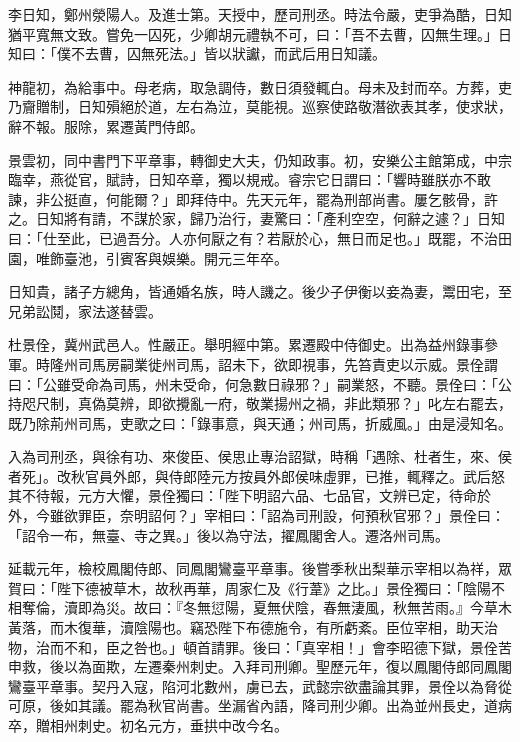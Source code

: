 \begin{pinyinscope}
 李日知，鄭州滎陽人。及進士第。天授中，歷司刑丞。時法令嚴，吏爭為酷，日知猶平寬無文致。嘗免一囚死，少卿胡元禮執不可，曰：「吾不去曹，囚無生理。」日知曰：「僕不去曹，囚無死法。」皆以狀讞，而武后用日知議。



 神龍初，為給事中。母老病，取急調侍，數日須發輒白。母未及封而卒。方葬，吏乃齎贈制，日知殞絕於道，左右為泣，莫能視。巡察使路敬潛欲表其孝，使求狀，辭不報。服除，累遷黃門侍郎。



 景雲初，同中書門下平章事，轉御史大夫，仍知政事。初，安樂公主館第成，中宗臨幸，燕從官，賦詩，日知卒章，獨以規戒。睿宗它日謂曰：「響時雖朕亦不敢諫，非公挺直，何能爾？」即拜侍中。先天元年，罷為刑部尚書。屢乞骸骨，許之。日知將有請，不謀於家，歸乃治行，妻驚曰：「產利空空，何辭之遽？」日知曰：「仕至此，已過吾分。人亦何厭之有？若厭於心，無日而足也。」既罷，不治田園，唯飾臺池，引賓客與娛樂。開元三年卒。



 日知貴，諸子方總角，皆通婚名族，時人譏之。後少子伊衡以妾為妻，鬻田宅，至兄弟訟鬩，家法遂替雲。



 杜景佺，冀州武邑人。性嚴正。舉明經中第。累遷殿中侍御史。出為益州錄事參軍。時隆州司馬房嗣業徙州司馬，詔未下，欲即視事，先笞責吏以示威。景佺謂曰：「公雖受命為司馬，州未受命，何急數日祿邪？」嗣業怒，不聽。景佺曰：「公持咫尺制，真偽莫辨，即欲攪亂一府，敬業揚州之禍，非此類邪？」叱左右罷去，既乃除荊州司馬，吏歌之曰：「錄事意，與天通；州司馬，折威風。」由是浸知名。



 入為司刑丞，與徐有功、來俊臣、侯思止專治詔獄，時稱「遇除、杜者生，來、侯者死」。改秋官員外郎，與侍郎陸元方按員外郎侯味虛罪，已推，輒釋之。武后怒其不待報，元方大懼，景佺獨曰：「陛下明詔六品、七品官，文辨已定，待命於外，今雖欲罪臣，奈明詔何？」宰相曰：「詔為司刑設，何預秋官邪？」景佺曰：「詔令一布，無臺、寺之異。」後以為守法，擢鳳閣舍人。遷洛州司馬。



 延載元年，檢校鳳閣侍郎、同鳳閣鸞臺平章事。後嘗季秋出梨華示宰相以為祥，眾賀曰：「陛下德被草木，故秋再華，周家仁及《行葦》之比。」景佺獨曰：「陰陽不相奪倫，瀆即為災。故曰：『冬無愆陽，夏無伏陰，春無淒風，秋無苦雨。』今草木黃落，而木復華，瀆陰陽也。竊恐陛下布德施令，有所虧紊。臣位宰相，助天治物，治而不和，臣之咎也。」頓首請罪。後曰：「真宰相！」會李昭德下獄，景佺苦申救，後以為面欺，左遷秦州刺史。入拜司刑卿。聖歷元年，復以鳳閣侍郎同鳳閣鸞臺平章事。契丹入寇，陷河北數州，虜已去，武懿宗欲盡論其罪，景佺以為脅從可原，後如其議。罷為秋官尚書。坐漏省內語，降司刑少卿。出為並州長史，道病卒，贈相州刺史。初名元方，垂拱中改今名。




\end{pinyinscope}
